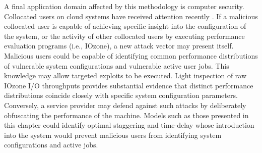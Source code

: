 A final application domain affected by this methodology is computer security. Collocated users on cloud systems have received attention recently \cite{ali2015security}. If a malicious collocated user is capable of achieving specific insight into the configuration of the system, or the activity of other collocated users by executing performance evaluation programs (i.e., IOzone), a new attack vector may present itself. Malicious users could be capable of identifying common performance distributions of vulnerable system configurations and vulnerable active user jobs. This knowledge may allow targeted exploits to be executed. Light inspection of raw IOzone I/O throughputs provides substantial evidence that distinct performance distributions coincide closely with specific system configuration parameters. Conversely, a service provider may defend against such attacks by deliberately obfuscating the performance of the machine. Models such as those presented in this chapter could identify optimal staggering and time-delay whose introduction into the system would prevent malicious users from identifying system configurations and active jobs.


